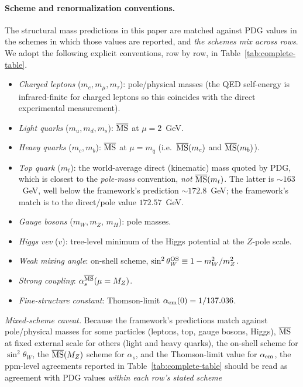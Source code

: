 ﻿\documentclass[reprint,amsmath,amssymb,aps,prd,longbibliography,floatfix]{revtex4-2}
\begin{document}
\paragraph{Scheme and renormalization conventions.}
The structural mass predictions in this paper are matched against
PDG values in the schemes in which those values are reported, and
\emph{the schemes mix across rows}. We adopt the following explicit
conventions, row by row, in Table~\ref{tab:complete-table}.
\begin{itemize}
\item \emph{Charged leptons} ($m_e, m_\mu, m_\tau$): pole/physical
masses (the QED self-energy is infrared-finite for charged leptons
so this coincides with the direct experimental measurement).
\item \emph{Light quarks} ($m_u, m_d, m_s$): $\overline{\rm MS}$ at
$\mu = 2$~GeV.
\item \emph{Heavy quarks} ($m_c, m_b$): $\overline{\rm MS}$ at
$\mu = m_q$ (i.e.\ $\overline{\rm MS}(m_c)$ and
$\overline{\rm MS}(m_b)$).
\item \emph{Top quark} ($m_t$): the world-average direct
(kinematic) mass quoted by PDG, which is closest to the
\emph{pole-mass} convention, \emph{not} $\overline{\rm MS}(m_t)$.
The latter is $\sim 163$~GeV, well below the framework's prediction
$\sim 172.8$~GeV; the framework's match is to the
direct/pole value $172.57$~GeV.
\item \emph{Gauge bosons} ($m_W, m_Z$, $m_H$): pole masses.
\item \emph{Higgs vev} ($v$): tree-level minimum of the Higgs
potential at the $Z$-pole scale.
\item \emph{Weak mixing angle}: on-shell scheme,
$\sin^2\theta_W^{\rm OS} \equiv 1 - m_W^2/m_Z^2$.
\item \emph{Strong coupling}: $\alpha_s^{\overline{\rm MS}}(\mu = M_Z)$.
\item \emph{Fine-structure constant}: Thomson-limit
$\alpha_{\rm em}(0) = 1/137.036$.
\end{itemize}
\emph{Mixed-scheme caveat.} Because the framework's predictions
match against pole/physical masses for some particles (leptons,
top, gauge bosons, Higgs), $\overline{\rm MS}$ at fixed external
scale for others (light and heavy quarks),
the on-shell scheme for $\sin^2\theta_W$, the
$\overline{\rm MS}(M_Z)$ scheme for $\alpha_s$, and the
Thomson-limit value for $\alpha_{\rm em}$, the ppm-level
agreements reported in Table~\ref{tab:complete-table} should be read as
agreement with PDG values \emph{within each row's stated scheme}
\end{document}
